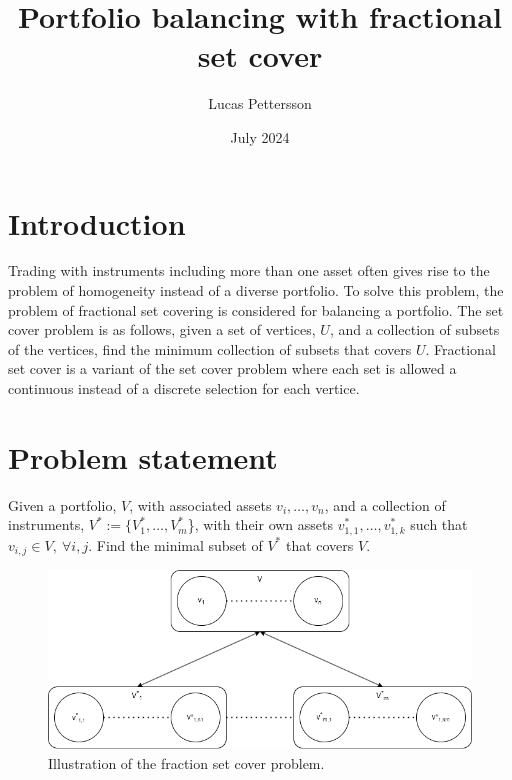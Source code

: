 \documentclass{article}
\title{Portfolio balancing with fractional set cover}
\author{Lucas Pettersson}
\date{July 2024}
\begin{document}
\maketitle
\newpage

\tableofcontents
\newpage


\section{Introduction}
Trading with instruments including more than one asset often gives rise to the problem of homogeneity instead of a diverse  portfolio. To solve this problem, the problem of fractional set covering is considered for balancing a portfolio. The set cover problem is as follows, given a set of vertices, $U$, and a collection of subsets of the vertices, find the minimum collection of subsets that covers $U$. Fractional set cover is a variant of the set cover problem where each set is allowed a continuous instead of a discrete selection for each vertice. \cite{bib:fracCover} 

\section{Problem statement}
Given a portfolio, $V$, with associated assets $v_i, \ldots, v_n$, and a collection of instruments, $V^* := \{V^*_1, \ldots, V^*_m$\}, with their own assets $v^*_{1,1}, \ldots, v^*_{1,k}$ such that $v_{i,j} \in V,~\forall i,j$. Find the minimal subset of $V^*$ that covers $V$.

\begin{figure}[H]
    \centering
    \includegraphics[scale=0.4]{figures/fracCov.png}
    \caption{Illustration of the fraction set cover problem.}
    \label{fig:fracCov}
\end{figure}
\end{document}
